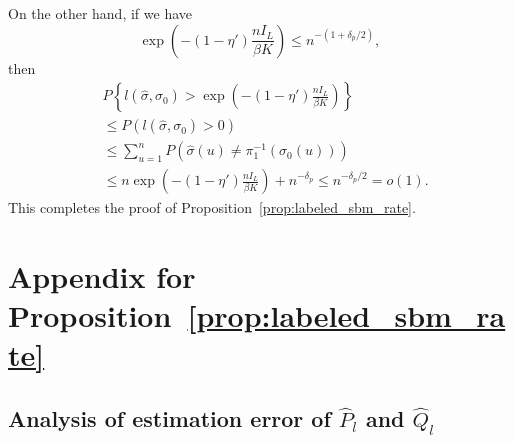 \documentclass{article}
\begin{document}
On the other hand, if we have 
$$ \exp\left( -(1 - \eta') \frac{n I_L}{\beta K} \right) \leq n^{-(1 + \delta_p/2)},$$
then
\begin{align*}
& P \left\{ l(\hat{\sigma}, \sigma_0) >  \exp\left( -(1 - \eta') \frac{n I_L}{\beta K} \right)  \right\} \\
&\leq P( l(\hat{\sigma}, \sigma_0) > 0 ) \\
& \leq \sum_{u=1}^n P( \hat{\sigma}(u) \neq \pi_1^{-1}(\sigma_0(u))) \\
&\leq n \exp\left( -(1 - \eta') \frac{n I_L}{\beta K} \right)  + n^{-\delta_p} \leq n^{-\delta_p /2} = o(1).
\end{align*}
This completes the proof of Proposition~\ref{prop:labeled_sbm_rate}.


\section{Appendix for Proposition~\ref{prop:labeled_sbm_rate}}
\label{appendix: labeled_sbm_rate}

\subsection{Analysis of estimation error of $\hat{P}_l$ and $\hat{Q}_l$}
\label{appendix: hats galore}
\end{document}
